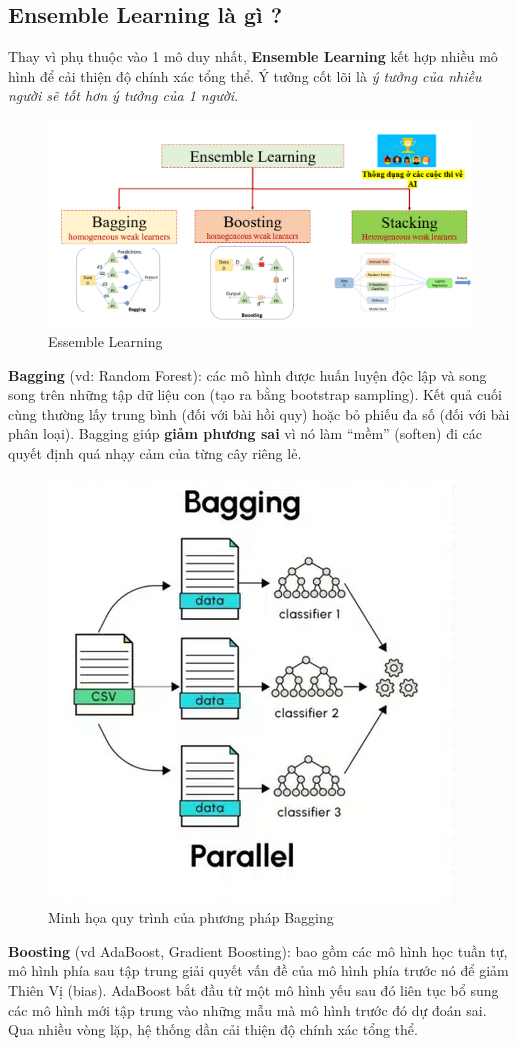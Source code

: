 \documentclass[11pt]{article}
\begin{document}
\subsection{Ensemble Learning là gì ?}
Thay vì phụ thuộc vào 1 mô  duy nhất,  \textbf{Ensemble Learning} kết hợp nhiều mô hình để cải thiện độ chính xác tổng thể. Ý tưởng cốt lõi là \textit{ý tưởng của nhiều người sẽ tốt hơn ý tưởng của 1 người}.

\begin{figure}[H]
    \centering
    \includegraphics[width=0.7\linewidth]{images/bg_bt_st.png}
    \caption{Essemble Learning}
\end{figure}

\textbf{Bagging} (vd: Random Forest): các mô hình được huấn luyện độc lập và song song trên những tập dữ liệu con (tạo ra bằng bootstrap sampling). Kết quả cuối cùng thường lấy trung bình (đối với bài hồi quy) hoặc bỏ phiếu đa số (đối với bài phân loại). Bagging giúp \textbf{giảm phương sai} vì nó làm “mềm” (soften) đi các quyết định quá nhạy cảm của từng cây riêng lẻ.  

\begin{figure}[H]
    \centering
    \includegraphics[width=0.4\linewidth]{images/bagging.png}
    \caption{Minh họa quy trình của phương pháp Bagging}
\end{figure}

\textbf{Boosting} (vd AdaBoost, Gradient Boosting): bao gồm các mô hình học tuần tự, mô hình phía sau tập trung giải quyết vấn đề của mô hình phía trước nó để giảm Thiên Vị (bias). AdaBoost bắt đầu từ một mô hình yếu sau đó liên tục bổ sung các mô hình mới tập trung vào những mẫu mà mô hình trước đó dự đoán sai. Qua nhiều vòng lặp, hệ thống dần cải thiện độ chính xác tổng thể.  \\
\end{document}

